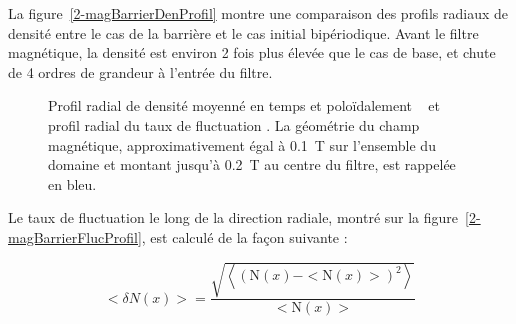 \begin{refsection}
La figure~\ref{2-magBarrierDenProfil} montre une comparaison des profils radiaux de
densité entre le
cas de la barrière et le cas initial bipériodique.
Avant le filtre magnétique, la densité est environ 2 fois plus élevée que le
cas de base, et chute de 4 ordres de grandeur à l'entrée du filtre.

\begin{figure}[!htbp]
    \centering
    \caption{Profil radial de densité moyenné en temps et poloïdalement
    ~ et profil radial du taux de fluctuation
    .
    La géométrie du champ magnétique, approximativement égal à 0.1~T sur
    l'ensemble du domaine et montant jusqu'à 0.2~T au centre du filtre, est
    rappelée en bleu.}
    \label{2-ProfMagBarrier}
\end{figure} 

Le taux de fluctuation le long de la direction radiale, montré sur la
figure~\ref{2-magBarrierFlucProfil}, est calculé de la façon suivante :

\begin{equation}
<\delta N(x)>=\frac{\sqrt{\left<(\text{N}(x)-<\text{N}(x)>)^2\right>}}{<\text{N}(x)>}
\end{equation}


\end{refsection}
